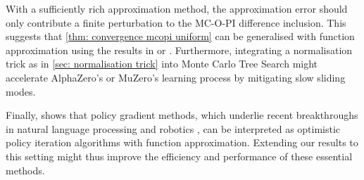 With a sufficiently rich approximation method,
the approximation error should only contribute a finite perturbation to the MC-O-PI difference inclusion.
This suggests that \autoref{thm: convergence mcopi uniform}
can be generalised with function approximation using the results in \citep[Section~4.3.3]{Bertsekas1996Neuro-DynamicProgramming} or \citep[Section~5.2]{Kushner2003StochasticApplications}.
Furthermore, integrating a normalisation trick as in \autoref{sec: normalisation trick} into Monte Carlo Tree Search might accelerate AlphaZero's or MuZero's learning process by mitigating slow sliding modes.



\vspace{-0.1cm}


Finally, \citet{Wagner2013OptimisticResult} shows that policy gradient methods, which underlie recent breakthroughs in natural language processing and robotics \citep{Schulman2017ProximalAlgorithms}, can be interpreted as optimistic policy iteration algorithms with function approximation. Extending our results to this setting might thus improve the efficiency and performance of these essential methods.







